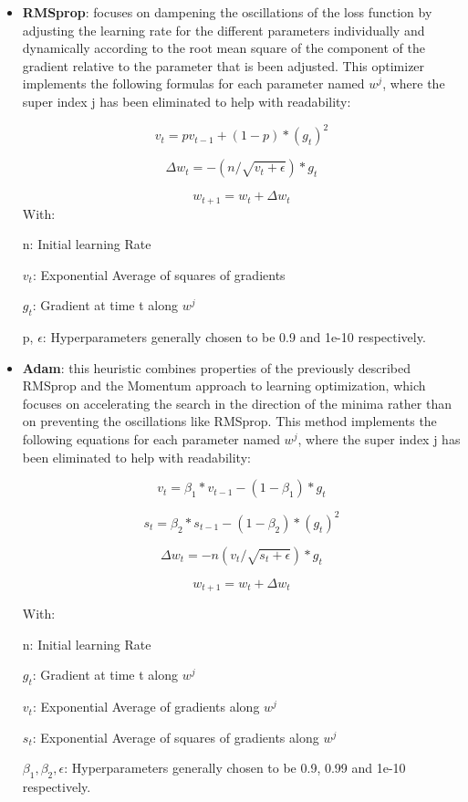 \documentclass[12pt, a4paper]{article}
\begin{document}
	
	\begin{itemize}
		\clearpage
		\item \textbf{RMSprop}: focuses on dampening the oscillations of the loss function by adjusting the learning rate for the different parameters individually and dynamically according to the root mean square of the component of the gradient relative to the parameter that is been adjusted. This optimizer implements the following formulas for each parameter named $w^j$, where the super index j has been eliminated to help with readability: \cite{RMSprop}
		
		
		\[v_t = pv_{t - 1} + (1-p)*(g_t)^2\]
		
		\[ \Delta w_t = - (n/\sqrt{v_t + \epsilon})*g_t\]
		
		\[ w_{t+1} = w_t + \Delta w_t\]
		With:
		
		n: Initial learning Rate
		
		$v_t$: Exponential Average of squares of gradients
		
		$g_t$: Gradient at time t along $w^j$ 
		
		p, $\epsilon$: Hyperparameters generally chosen to be 0.9 and 1e-10 respectively.
		
			\vspace{5mm}
			
		\item \textbf{Adam}: this heuristic combines properties of the previously described RMSprop and the Momentum approach to learning optimization, which focuses on accelerating the search in the direction of the minima rather than on preventing the oscillations like RMSprop. This method implements the following equations for each parameter named $w^j$, where the super index j has been eliminated to help with readability:
		
		\[v_t = \beta_1 * v_{t-1} - (1- \beta_1) * g_t \]
		
		\[s_t = \beta_2 * s_{t-1} - (1- \beta_2) * (g_t)^2 \]
		
		\[ \Delta w_t = - n( v_t/\sqrt{s_t + \epsilon})*g_t\]
		
		\[ w_{t+1} = w_t + \Delta w_t\]
		
		With:
		
		n: Initial learning Rate
		
		$g_t$: Gradient at time t along $w^j$
		
		$v_t$: Exponential Average of gradients along $w^j$
		
		$s_t$: Exponential Average of squares of gradients along $w^j$
		
		$\beta_1,\beta_2, \epsilon$: Hyperparameters generally chosen to be 0.9, 0.99 and 1e-10 respectively.
		
	\end{itemize}
\end{document}

